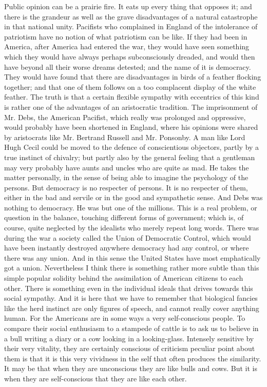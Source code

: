 \documentclass{book}
\begin{document}
Public opinion can be a prairie fire. It eats up every thing that opposes it; and there is the grandeur as well as the grave disadvantages of a natural catastrophe in that national unity. Pacifists who complained in England of the intolerance of patriotism have no notion of what patriotism can be like. If they had been in America, after America had entered the war, they would have seen something which they would have always perhaps subconsciously dreaded, and would then have beyond all their worse dreams detested; and the name of it is democracy. They would have found that there are disadvantages in birds of a feather flocking together; and that one of them follows on a too complacent display of the white feather. The truth is that a certain flexible sympathy with eccentrics of this kind is rather one of the advantages of an aristocratic tradition. The imprisonment of Mr. Debs, the American Pacifist, which really was prolonged and oppressive, would probably have been shortened in England, where his opinions were shared by aristocrats like Mr. Bertrand Russell and Mr. Ponsonby. A man like Lord Hugh Cecil could be moved to the defence of conscientious objectors, partly by a true instinct of chivalry; but partly also by the general feeling that a gentleman may very probably have aunts and uncles who are quite as mad. He takes the matter personally, in the sense of being able to imagine the psychology of the persons. But democracy is no respecter of persons. It is no respecter of them, either in the bad and servile or in the good and sympathetic sense. And Debs was nothing to democracy. He was but one of the millions. This is a real problem, or question in the balance, touching different forms of government; which is, of course, quite neglected by the idealists who merely repeat long words. There was during the war a society called the Union of Democratic Control, which would have been instantly destroyed anywhere democracy had any control, or where there was any union. And in this sense the United States have most emphatically got a union. Nevertheless I think there is something rather more subtle than this simple popular solidity behind the assimilation of American citizens to each other. There is something even in the individual ideals that drives towards this social sympathy. And it is here that we have to remember that biological fancies like the herd instinct are only figures of speech, and cannot really cover anything human. For the Americans are in some ways a very self-conscious people. To compare their social enthusiasm to a stampede of cattle is to ask us to believe in a bull writing a diary or a cow looking in a looking-glass. Intensely sensitive by their very vitality, they are certainly conscious of criticism peculiar point about them is that it is this very vividness in the self that often produces the similarity. It may be that when they are unconscious they are like bulls and cows. But it is when they are self-conscious that they are like each other.
\end{document}
